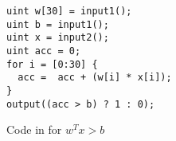 \begin{figure}
\begin{verbatim}
uint w[30] = input1();
uint b = input1();
uint x = input2();
uint acc = 0;
for i = [0:30] {
  acc =  acc + (w[i] * x[i]);
}
output((acc > b) ? 1 : 0);
\end{verbatim}
\caption{Code in \tool for $w^Tx >b$}
\label{fig:ex-sml}
\end{figure}

